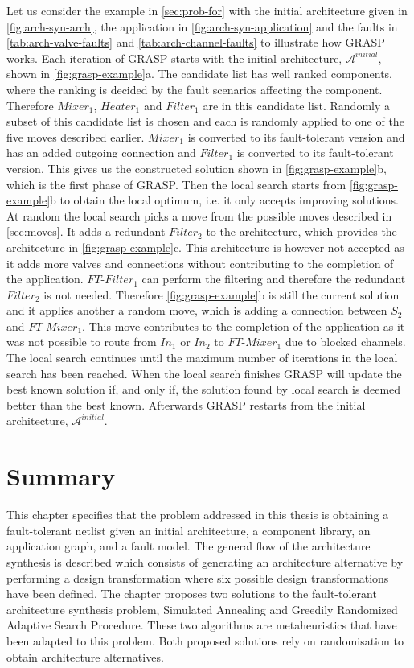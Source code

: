 Let us consider the example in \autoref{sec:prob-for} with the initial architecture given in \autoref{fig:arch-syn-arch}, the application in \autoref{fig:arch-syn-application} and the faults in \autoref{tab:arch-valve-faults} and \autoref{tab:arch-channel-faults} to illustrate how GRASP works. Each iteration of GRASP starts with the initial architecture, $\mathcal{A}^{initial}$, shown in \autoref{fig:grasp-example}a. The candidate list has well ranked components, where the ranking is decided by the fault scenarios affecting the component. Therefore $Mixer_1$, $Heater_1$ and $Filter_1$ are in this candidate list. Randomly a subset of this candidate list is chosen and each is randomly applied to one of the five moves described earlier. $Mixer_1$ is converted to its fault-tolerant version and has an added outgoing connection and $Filter_1$ is converted to its fault-tolerant version. This gives us the constructed solution shown in \autoref{fig:grasp-example}b, which is the first phase of GRASP. Then the local search starts from \autoref{fig:grasp-example}b to obtain the local optimum, i.e. it only accepts improving solutions. At random the local search picks a move from the possible moves described in \autoref{sec:moves}. It adds a redundant $Filter_2$ to the architecture, which provides the architecture in \autoref{fig:grasp-example}c. This architecture is however not accepted as it adds more valves and connections without contributing to the completion of the application. $FT$-$Filter_1$ can perform the filtering and therefore the redundant $Filter_2$ is not needed. Therefore \autoref{fig:grasp-example}b is still the current solution and it applies another a random move, which is adding a connection between $S_2$ and $FT$-$Mixer_1$. This move contributes to the completion of the application as it was not possible to route from $In_1$ or $In_2$ to $FT$-$Mixer_1$ due to blocked channels. The local search continues until the maximum number of iterations in the local search has been reached. When the local search finishes GRASP will update the best known solution if, and only if, the solution found by local search is deemed better than the best known. Afterwards GRASP restarts from the initial architecture, $\mathcal{A}^{initial}$.

\section{Summary}
This chapter specifies that the problem addressed in this thesis is obtaining a fault-tolerant netlist given an initial architecture, a component library, an application graph, and a fault model. The general flow of the architecture synthesis is described which consists of generating an architecture alternative by performing a design transformation where six possible design transformations have been defined. The chapter proposes two solutions to the fault-tolerant architecture synthesis problem, Simulated Annealing and Greedily Randomized Adaptive Search Procedure. These two algorithms are metaheuristics that have been adapted to this problem. Both proposed solutions rely on randomisation to obtain architecture alternatives.